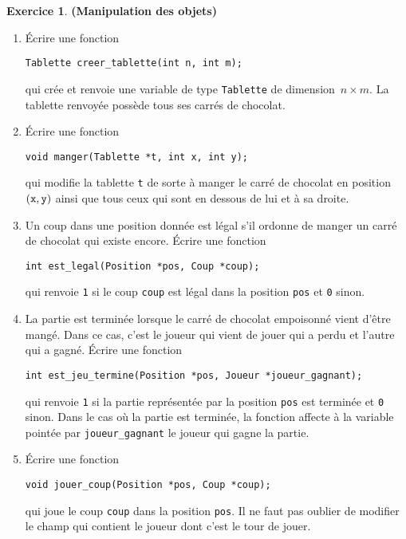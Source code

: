 \documentclass[12pt]{article}
\theoremstyle{definition}
\newtheorem{Exercice}{Exercice}
\begin{document}
\begin{Exercice} {\bf (Manipulation des objets)}\smallskip
\label{ex:2}

    \begin{enumerate}
        \item Écrire une fonction
\begin{lstlisting}
Tablette creer_tablette(int n, int m);
\end{lstlisting}
        qui crée et renvoie une variable de type {\tt Tablette} de
        dimension~$n \times m$. La tablette renvoyée possède tous ses
        carrés de chocolat.
        \smallskip

        \item Écrire une fonction
\begin{lstlisting}
void manger(Tablette *t, int x, int y);
\end{lstlisting}
        qui modifie la tablette {\tt t} de sorte à manger le carré de chocolat
        en position $({\tt x}, {\tt y})$ ainsi que tous ceux qui sont en dessous de lui
        et à sa droite.
        \smallskip

        \item Un coup dans une position donnée est légal s'il ordonne de manger
        un carré de chocolat qui existe encore. Écrire une fonction
\begin{lstlisting}
int est_legal(Position *pos, Coup *coup);
\end{lstlisting}
        qui renvoie {\tt 1} si le coup {\tt coup} est légal dans la position
        {\tt pos} et {\tt 0} sinon.
        \smallskip

        \item La partie est terminée lorsque le carré de chocolat empoisonné
        vient d'être mangé. Dans ce cas, c'est le joueur qui vient de jouer
        qui a perdu et l'autre qui a gagné. Écrire une fonction
\begin{lstlisting}
int est_jeu_termine(Position *pos, Joueur *joueur_gagnant);
\end{lstlisting}
        qui renvoie {\tt 1} si la partie représentée par la position {\tt pos}
        est terminée et {\tt 0} sinon. Dans le cas où la partie est terminée,
        la fonction affecte à la variable pointée par {\tt joueur\_gagnant}
        le joueur qui gagne la partie.
        \smallskip

        \item Écrire une fonction
\begin{lstlisting}
void jouer_coup(Position *pos, Coup *coup);
\end{lstlisting}
        qui joue le coup {\tt coup} dans la position {\tt pos}. Il ne faut pas
        oublier de modifier le champ qui contient le joueur dont c'est le tour de jouer.
    \end{enumerate}
\end{Exercice}
\bigskip
\end{document}
